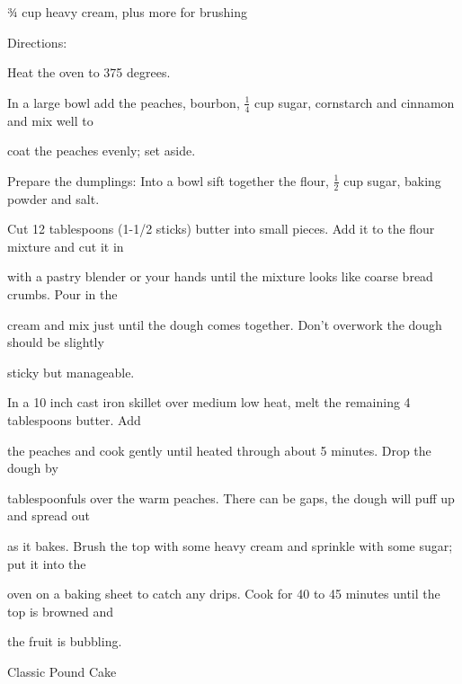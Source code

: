 \documentclass[a4paper,portrait,12pt]{book}
\begin{document}
¾ cup heavy cream, plus more for brushing




Directions:




Heat the oven to 375 degrees.




In a large bowl add the peaches, bourbon, $\frac{1}{4}$ cup sugar, cornstarch and cinnamon and mix well to




coat the peaches evenly; set aside.




Prepare the dumplings: Into a bowl sift together the flour, $\frac{1}{2}$ cup sugar, baking powder and salt.




Cut 12 tablespoons (1-1/2 sticks) butter into small pieces. Add it to the flour mixture and cut it in




with a pastry blender or your hands until the mixture looks like coarse bread crumbs. Pour in the




cream and mix just until the dough comes together. Don't overwork the dough should be slightly




sticky but manageable.




In a 10 inch cast iron skillet over medium low heat, melt the remaining 4 tablespoons butter. Add




the peaches and cook gently until heated through about 5 minutes. Drop the dough by




tablespoonfuls over the warm peaches. There can be gaps, the dough will puff up and spread out




as it bakes. Brush the top with some heavy cream and sprinkle with some sugar; put it into the




oven on a baking sheet to catch any drips. Cook for 40 to 45 minutes until the top is browned and




the fruit is bubbling.







\newpage
Classic Pound Cake
\end{document}
